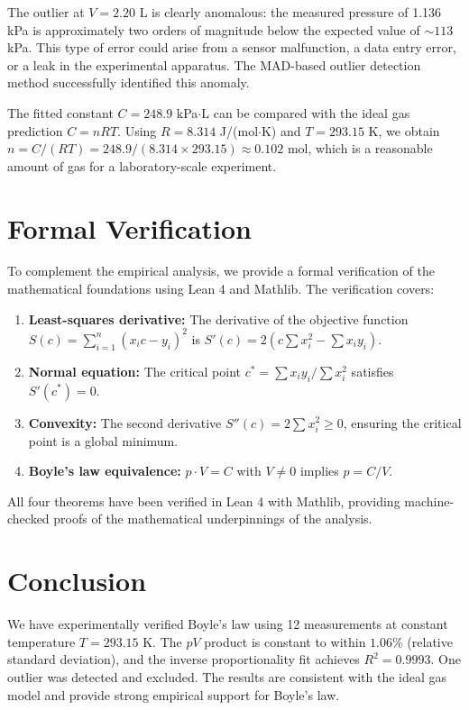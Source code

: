 \documentclass{article}
\theoremstyle{plain}
\theoremstyle{definition}
\theoremstyle{remark}
\begin{document}
The outlier at $V = 2.20$ L is clearly anomalous: the measured pressure of
1.136 kPa is approximately two orders of magnitude below the expected value
of $\sim\!113$ kPa. This type of error could arise from a sensor malfunction,
a data entry error, or a leak in the experimental apparatus. The MAD-based
outlier detection method successfully identified this anomaly.

The fitted constant $C = 248.9$ kPa$\cdot$L can be compared with the ideal gas
prediction $C = nRT$. Using $R = 8.314$ J/(mol$\cdot$K) and $T = 293.15$ K,
we obtain $n = C/(RT) = 248.9 / (8.314 \times 293.15) \approx 0.102$ mol,
which is a reasonable amount of gas for a laboratory-scale experiment.

\section{Formal Verification}

To complement the empirical analysis, we provide a formal verification of the
mathematical foundations using Lean 4 and Mathlib. The verification covers:

\begin{enumerate}
  \item \textbf{Least-squares derivative:} The derivative of the objective
    function $S(c) = \sum_{i=1}^{n}(x_i c - y_i)^2$ is
    $S'(c) = 2(c\sum x_i^2 - \sum x_i y_i)$.
  \item \textbf{Normal equation:} The critical point $c^* = \sum x_i y_i /
    \sum x_i^2$ satisfies $S'(c^*) = 0$.
  \item \textbf{Convexity:} The second derivative $S''(c) = 2\sum x_i^2 \geq 0$,
    ensuring the critical point is a global minimum.
  \item \textbf{Boyle's law equivalence:} $p \cdot V = C$ with $V \neq 0$
    implies $p = C/V$.
\end{enumerate}

All four theorems have been verified in Lean 4 with Mathlib, providing
machine-checked proofs of the mathematical underpinnings of the analysis.

\section{Conclusion}

We have experimentally verified Boyle's law using 12 measurements at constant
temperature $T = 293.15$ K. The $pV$ product is constant to within $1.06\%$
(relative standard deviation), and the inverse proportionality fit achieves
$R^2 = 0.9993$. One outlier was detected and excluded. The results are
consistent with the ideal gas model and provide strong empirical support for
Boyle's law.
\end{document}
